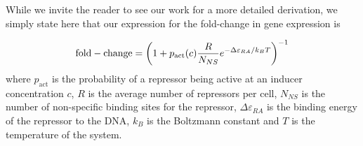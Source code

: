 \documentclass[letterpaper, 10pt]{article}
\begin{document}
\begin{figure}
  \label{fig:simple_repression}
\end{figure}



While we invite the reader to see our work for a more detailed derivation, we
simply state here that our expression for the fold-change in gene expression is

\begin{equation}
\mathrm{fold-change} = \left(1 + p_\mathrm{act}(c) {R \over
N_{NS}}e^{-\Delta\varepsilon_{RA}/ k_BT}\right)^{-1}
\label{eq:fold-change}
\end{equation}
where $p_\mathrm{act}$ is the probability of a repressor being active at an
inducer concentration $c$, $R$ is the average number of repressors per cell,
$N_{NS}$ is the number of non-specific binding sites for the repressor,
$\Delta\varepsilon_{RA}$ is the binding energy of the repressor to the DNA,
$k_B$ is the Boltzmann constant and $T$ is the temperature of the system.
\end{document}
